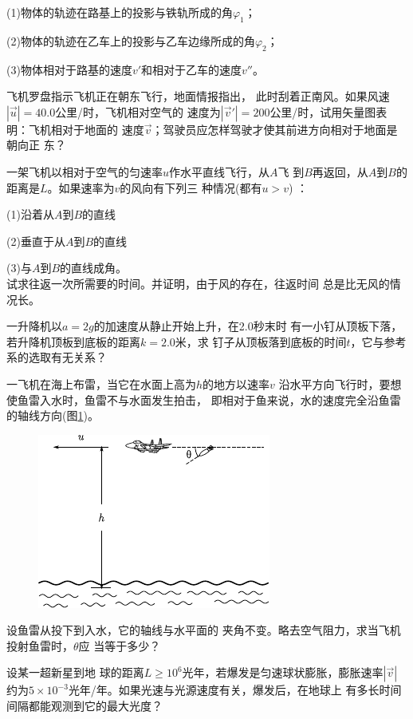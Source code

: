 \begin{exercises}
(1)物体的轨迹在路基上的投影与铁轨所成的角$ \varphi _1 $；

(2)物体的轨迹在乙车上的投影与乙车边缘所成的角$ \varphi _2 $；

(3)物体相对于路基的速度$ v' $和相对于乙车的速度$ v'' $。

\exercise 飞机罗盘指示飞机正在朝东飞行，地面情报指出，
此时刮着正南风。如果风速$ | \vec{u} | = 4 0 . 0  $公里/时，飞机相对空气的
速度为$ | \vec{v} ' | = 2 0 0  $公里/时，试用矢量图表明：飞机相对于地面的
速度$\vec{v}$；驾驶员应怎样驾驶才使其前进方向相对于地面是朝向正
东？

\exercise 一架飞机以相对于空气的匀速率$u$作水平直线飞行，从$A$飞
到$B$再返回，从$A$到$B$的距离是$L$。如果速率为$v$的风向有下列三
种情况(都有$ u > v$)  ：

(1)沿着从$A$到$B$的直线

(2)垂直于从$A$到$B$的直线

(3)与$A$到$B$的直线成角。\\
试求往返一次所需要的时间。并证明，由于风的存在，往返时间
总是比无风的情况长。

\exercise 一升降机以$ a = 2 g  $的加速度从静止开始上升，在2.0秒末时
有一小钉从顶板下落，若升降机顶板到底板的距离$ k = 2 . 0  $米，求
钉子从顶板落到底板的时间$t$，它与参考系的选取有无关系？

\exercise 一飞机在海上布雷，当它在水面上高为$h$的地方以速率$v$
沿水平方向飞行时，要想使鱼雷入水时，鱼雷不与水面发生拍击，
即相对于鱼来说，水的速度完全沿鱼雷的轴线方向(图\ref{fig:02.18})。
\begin{figure}
    \includegraphics{figure/fig02.18}
    \caption{}
    \label{fig:02.18}
\end{figure}
设鱼雷从投下到入水，它的轴线与水平面的
夹角不变。略去空气阻力，求当飞机投射鱼雷时，$\theta$应
当等于多少？

\exercise 设某一超新星到地
球的距离$ L \geqslant 1 0 ^ { 6 }  $光年，若爆发是匀速球状膨胀，膨胀速率$|\vec{v}|$约为$5 \times 1 0 ^ { - 3 }  $光年/年。如果光速与光源速度有关，爆发后，在地球上
有多长时间间隔都能观测到它的最大光度？


\end{exercises}
